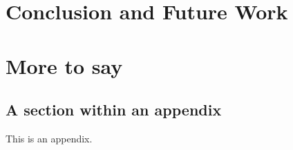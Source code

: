 \chapter{Conclusion and Future Work}


\appendix

\chapter{More to say}

\section{A section within an appendix}
This is an appendix.




\singlespacing

%
%
%


